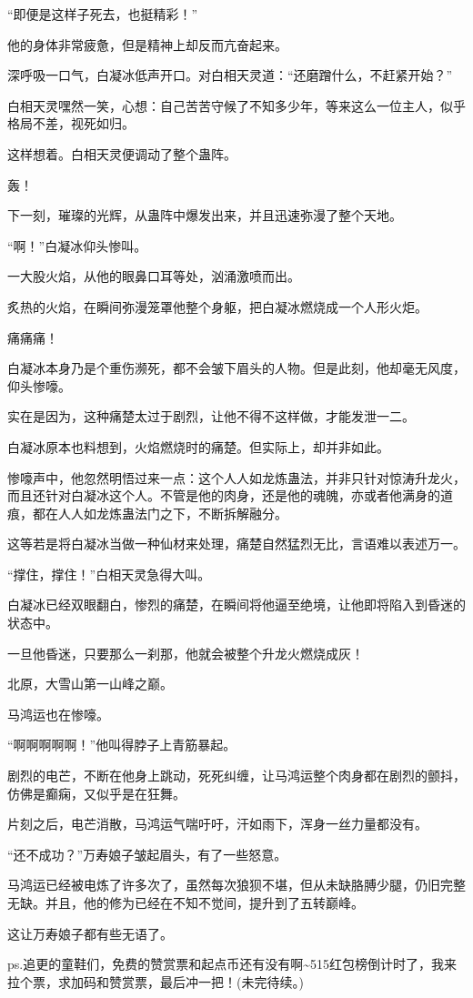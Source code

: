 \begin{this_body}
“即便是这样子死去，也挺精彩！”

他的身体非常疲惫，但是精神上却反而亢奋起来。

深呼吸一口气，白凝冰低声开口。对白相天灵道：“还磨蹭什么，不赶紧开始？”

白相天灵嘿然一笑，心想：自己苦苦守候了不知多少年，等来这么一位主人，似乎格局不差，视死如归。

这样想着。白相天灵便调动了整个蛊阵。

轰！

下一刻，璀璨的光辉，从蛊阵中爆发出来，并且迅速弥漫了整个天地。

“啊！”白凝冰仰头惨叫。

一大股火焰，从他的眼鼻口耳等处，汹涌激喷而出。

炙热的火焰，在瞬间弥漫笼罩他整个身躯，把白凝冰燃烧成一个人形火炬。

痛痛痛！

白凝冰本身乃是个重伤濒死，都不会皱下眉头的人物。但是此刻，他却毫无风度，仰头惨嚎。

实在是因为，这种痛楚太过于剧烈，让他不得不这样做，才能发泄一二。

白凝冰原本也料想到，火焰燃烧时的痛楚。但实际上，却并非如此。

惨嚎声中，他忽然明悟过来一点：这个人人如龙炼蛊法，并非只针对惊涛升龙火，而且还针对白凝冰这个人。不管是他的肉身，还是他的魂魄，亦或者他满身的道痕，都在人人如龙炼蛊法门之下，不断拆解融分。

这等若是将白凝冰当做一种仙材来处理，痛楚自然猛烈无比，言语难以表述万一。

“撑住，撑住！”白相天灵急得大叫。

白凝冰已经双眼翻白，惨烈的痛楚，在瞬间将他逼至绝境，让他即将陷入到昏迷的状态中。

一旦他昏迷，只要那么一刹那，他就会被整个升龙火燃烧成灰！

北原，大雪山第一山峰之巅。

马鸿运也在惨嚎。

“啊啊啊啊啊！”他叫得脖子上青筋暴起。

剧烈的电芒，不断在他身上跳动，死死纠缠，让马鸿运整个肉身都在剧烈的颤抖，仿佛是癫痫，又似乎是在狂舞。

片刻之后，电芒消散，马鸿运气喘吁吁，汗如雨下，浑身一丝力量都没有。

“还不成功？”万寿娘子皱起眉头，有了一些怒意。

马鸿运已经被电炼了许多次了，虽然每次狼狈不堪，但从未缺胳膊少腿，仍旧完整无缺。并且，他的修为已经在不知不觉间，提升到了五转巅峰。

这让万寿娘子都有些无语了。

ps.追更的童鞋们，免费的赞赏票和起点币还有没有啊\~{}515红包榜倒计时了，我来拉个票，求加码和赞赏票，最后冲一把！(未完待续。)

\end{this_body}

